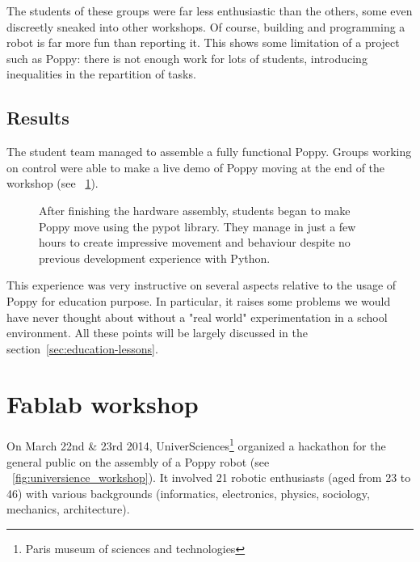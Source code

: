 The students of these groups were far less enthusiastic than the others, some even discreetly sneaked into other workshops. Of course, building and programming a robot is  far more fun than reporting it. This shows some limitation of a project such as Poppy: there is not enough work for lots of students, introducing inequalities in the repartition of tasks.

\subsection{Results} %

The student team managed to assemble a fully functional Poppy. Groups working on control were able to make a live demo of Poppy moving at the end of the workshop (see \figurename~\ref{fig:saintonge_demonstration}).

\begin{figure}[tb]
\centering
    \hfill
    \caption{After finishing the hardware assembly, students began to make Poppy move using the pypot library. They manage in just a few hours to create impressive movement and behaviour despite no previous development experience with Python.}
    \label{fig:saintonge_demonstration}
\end{figure}

This experience was very instructive on several aspects relative to the usage of Poppy for education purpose. In particular, it raises some problems we would have never thought about without a "real world" experimentation in a school environment. All these points will be largely discussed in the section~\ref{sec:education-lessons}.

\newpage
\section{Fablab workshop} %
\label{sec:poppy_universience}

On March 22nd \& 23rd 2014, UniverSciences\footnote{Paris museum of sciences and technologies} organized a hackathon for the general public on the assembly of a Poppy robot (see \figurename~\ref{fig:universience_workshop}).
It involved 21 robotic enthusiasts (aged from 23 to 46) with various backgrounds (informatics, electronics, physics, sociology, mechanics, architecture).

